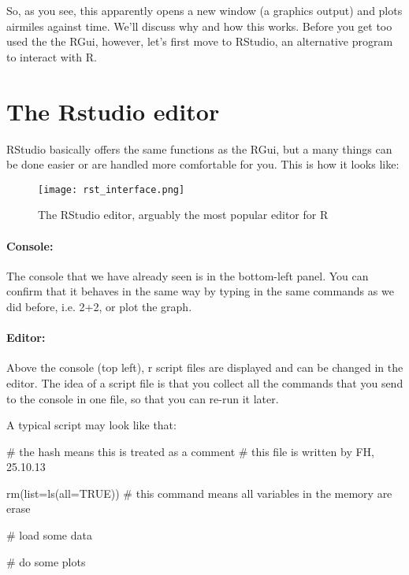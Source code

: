 \documentclass[a4paper,twoside]{tufte-book}\usepackage[]{graphicx}\usepackage[]{color}
\begin{document}
{\begin{appendices}
So, as you see, this apparently opens a new window (a graphics output) and plots airmiles against time. We'll discuss why and how this works. Before you get too used the the RGui, however, let's first move to RStudio, an alternative program to interact with R.

\section{The Rstudio editor}
 
RStudio basically offers the same functions as the RGui, but a many things can be done easier or are handled more comfortable for you. This is how it looks like:

\begin{figure}[]
\begin{center}
\texttt{[image: rst\_interface.png]}
\caption{The RStudio editor, arguably the most popular editor for R}
\label{fig: Rstudio}
\end{center}
\end{figure}


\paragraph{Console:} The console that we have already seen is in the bottom-left panel. You can confirm that it behaves in the same way by typing in the same commands as we did before, i.e. 2+2, or plot the graph.

\paragraph{Editor:} Above the console (top left), r script files are displayed and can be changed in the editor. The idea of a script file is that you collect all the commands that you send to the console in one file, so that you can re-run it later.  

A typical script may look like that:

\begin{Schunk}
\begin{Sinput}
# the hash means this is treated as a comment
# this file is written by FH, 25.10.13

rm(list=ls(all=TRUE))  # this command means all variables in the memory are erase

# load some data

# do some plots
\end{Sinput}
\end{Schunk}


\end{appendices}}
\end{document}
